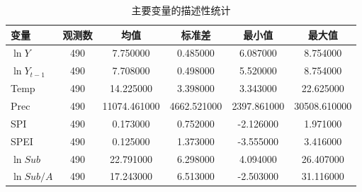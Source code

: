 \begin{table}
\caption{主要变量的描述性统计}
\label{tab:desc_stats}
\begin{tabular}{lccccc}
\toprule
变量 & 观测数 & 均值 & 标准差 & 最小值 & 最大值 \\
\midrule
$\ln Y$ & 490 & 7.750000 & 0.485000 & 6.087000 & 8.754000 \\
$\ln Y_{t-1}$ & 490 & 7.708000 & 0.498000 & 5.520000 & 8.754000 \\
Temp & 490 & 14.225000 & 3.398000 & 3.343000 & 22.625000 \\
Prec & 490 & 11074.461000 & 4662.521000 & 2397.861000 & 30508.610000 \\
SPI & 490 & 0.173000 & 0.752000 & -2.126000 & 1.971000 \\
SPEI & 490 & 0.125000 & 1.373000 & -3.555000 & 3.416000 \\
$\ln Sub$ & 490 & 22.791000 & 6.298000 & 4.094000 & 26.407000 \\
$\ln Sub/A$ & 490 & 17.243000 & 6.513000 & -2.503000 & 31.116000 \\
\bottomrule
\end{tabular}
\end{table}
